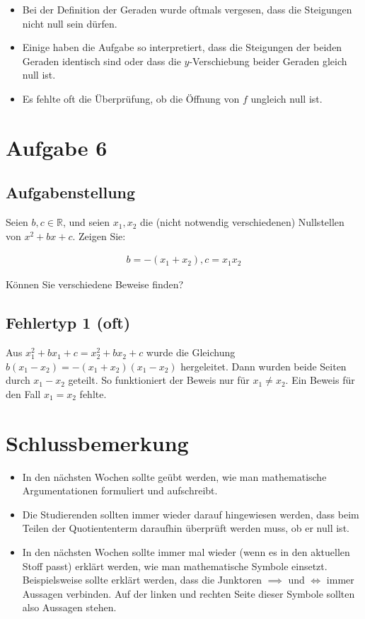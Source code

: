 \documentclass[a4paper]{article}
\newcommand*{\R}{\mathbb R}
\begin{document}
\begin{itemize}
  \item Bei der Definition der Geraden wurde oftmals vergesen, dass die Steigungen nicht null sein dürfen.
  \item Einige haben die Aufgabe so interpretiert, dass die Steigungen der beiden Geraden identisch sind oder dass die $y$-Verschiebung beider Geraden gleich null ist.
  \item Es fehlte oft die Überprüfung, ob die Öffnung von $f$ ungleich null ist.
\end{itemize}

\section{Aufgabe 6}

\subsection{Aufgabenstellung}

Seien $b,c\in\R$, und seien $x_1,x_2$ die (nicht notwendig verschiedenen) Nullstellen von $x^2+bx+c$. Zeigen Sie:

\begin{align}
  b=-(x_1+x_2), c=x_1x_2
\end{align}

Können Sie verschiedene Beweise finden?

\subsection{Fehlertyp 1 (oft)}

Aus $x_1^2+bx_1+c=x_2^2+bx_2+c$ wurde die Gleichung $b(x_1-x_2)=-(x_1+x_2)(x_1-x_2)$ hergeleitet. Dann wurden beide Seiten durch $x_1-x_2$ geteilt. So funktioniert der Beweis nur für $x_1\neq x_2$. Ein Beweis für den Fall $x_1=x_2$ fehlte.

\section{Schlussbemerkung}

\begin{itemize}
  \item In den nächsten Wochen sollte geübt werden, wie man mathematische Argumentationen formuliert und aufschreibt.
  \item Die Studierenden sollten immer wieder darauf hingewiesen werden, dass beim Teilen der Quotiententerm daraufhin überprüft werden muss, ob er null ist.
  \item In den nächsten Wochen sollte immer mal wieder (wenn es in den aktuellen Stoff passt) erklärt werden, wie man mathematische Symbole einsetzt. Beispielsweise sollte erklärt werden, dass die Junktoren $\implies$ und $\iff$ immer Aussagen verbinden. Auf der linken und rechten Seite dieser Symbole sollten also Aussagen stehen.
\end{itemize}
\end{document}
